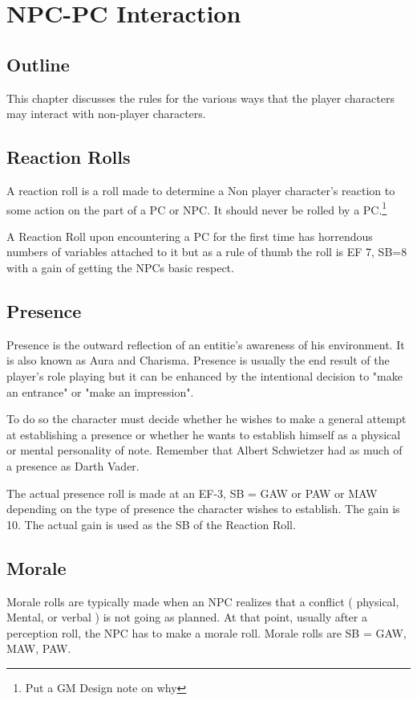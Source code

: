 \chapter{NPC-PC Interaction}

\section{Outline}

This chapter discusses the rules for the various ways that the player 
characters may interact with non-player characters.

\section{Reaction Rolls}

A reaction roll is a roll made to determine a Non player character's 
reaction to some action on the part of a PC or NPC. It should never 
be rolled by a PC.\footnote{Put a GM Design note on why }

A Reaction Roll upon encountering a PC for the first time has 
horrendous numbers of variables attached to it but as a rule of thumb 
the roll is EF 7, SB=8 with a gain of getting the NPCs basic respect.

\section{Presence}

Presence is the outward reflection of an entitie's awareness of his 
environment. It is also known as Aura and Charisma. Presence is 
usually the end result of the player's role playing but it can be 
enhanced by the intentional decision to "make an entrance" or "make an 
impression".

To do so the character must decide whether he wishes to make a
general attempt at establishing a presence or whether he wants to 
establish himself as a physical or mental personality of note.
Remember that Albert Schwietzer had as much of a presence as Darth
Vader.

The actual presence roll is made at an EF-3, SB = GAW or PAW or MAW 
depending on the type of presence the character wishes to establish. 
The gain is 10. The actual gain is used as the SB of the Reaction 
Roll. 

\section{Morale}

Morale rolls are typically made when an NPC realizes that a conflict 
( physical, Mental, or verbal ) is not going as planned. At that point,
usually after a perception roll, the NPC has to make a morale roll. 
Morale rolls are SB = GAW, MAW, PAW.



